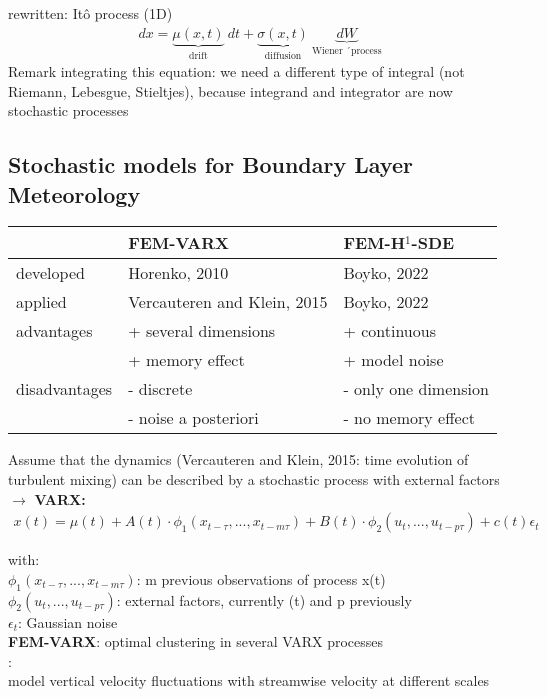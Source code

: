 \documentclass[11pt]{article}
\begin{document}
	rewritten: Itô process (1D)
	\begin{align}
		dx = \underbrace{\mu(x,t)}_{\textrm{drift}} \:dt + \underbrace{\sigma(x,t)}_{\textrm{diffusion}} \: \underbrace{dW}_{\textrm{Wiener ´process}}
	\end{align}
	Remark integrating this equation: we need a different type of integral (not Riemann, Lebesgue, Stieltjes), because integrand and integrator are now stochastic processes
	
	\subsection{Stochastic models for Boundary Layer Meteorology}
	\begin{table}[H]
		\begin{tabular}{lll}
			&\textbf{FEM-VARX} & 	\textbf{FEM-H$^1$-SDE} \\
			\hline
			developed & Horenko, 2010 & Boyko, 2022 \\
			applied & Vercauteren and Klein, 2015 & Boyko, 2022 \\
			\hline
			advantages & + several dimensions & + continuous \\
			&+ memory effect & + model noise \\
			disadvantages & - discrete & - only one dimension \\
			& - noise a posteriori & - no memory effect 
		\end{tabular} 
	\centering
	\end{table}
Assume that the dynamics (Vercauteren and Klein, 2015: time evolution of turbulent mixing) can be described by a stochastic process with external factors $\rightarrow$ \textbf{VARX:}
\begin{align}
	x(t) = \mu(t) + A(t) \cdot \phi_1(x_{t-\tau}, ..., x_{t-m\tau}) + B(t) \cdot \phi_2(u_t, ...,u_{t-p\tau})  + c(t) \epsilon_t
\end{align}

with:\\
$\phi_1(x_{t-\tau}, ..., x_{t-m\tau})$: m previous observations of process x(t) \\
$\phi_2(u_t, ...,u_{t-p\tau})$: external factors, currently (t) and p previously \\
$\epsilon_t$: Gaussian noise\\

\textbf{FEM-VARX}: optimal clustering in several VARX processes\\

\citet{Vercauteren2015}:\\
model vertical velocity fluctuations with streamwise velocity at different scales\\
\end{document}
